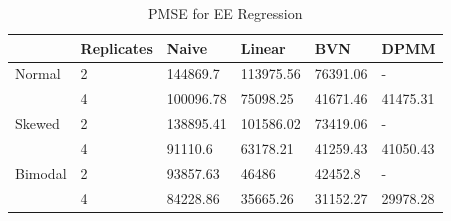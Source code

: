 \documentclass[11pt]{article}\usepackage[]{graphicx}\usepackage[]{color}
\begin{document}
\begin{landscape}
\begin{table}[ht]
\vspace{1cm}


\caption{Summary of Simulation under Bimodal Errors for N{\"a}ive, LME,  BVN, DPMM Models, respectively}
\label{bsumtable}
\end{table}

\end{landscape}
\restoregeometry


\begin{table}[ht]
\centering
\begin{tabular}{ll|llll}
  \hline
 & Replicates & Naive & Linear & BVN & DPMM \\ 
  \hline
Normal & 2 & 144869.7 & 113975.56 & 76391.06 & - \\ 
   & 4 & 100096.78 & 75098.25 & 41671.46 & 41475.31 \\ 
  Skewed & 2 & 138895.41 & 101586.02 & 73419.06 & - \\ 
   & 4 & 91110.6 & 63178.21 & 41259.43 & 41050.43 \\ 
  Bimodal & 2 & 93857.63 & 46486 & 42452.8 & - \\ 
   & 4 & 84228.86 & 35665.26 & 31152.27 & 29978.28 \\ 
   \hline
\end{tabular}
\caption{PMSE for EE Regression} 
\label{pmseee}
\end{table}
\end{document}

